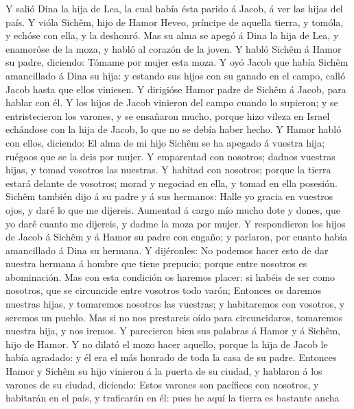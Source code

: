  Y salió Dina la hija de Lea, la cual había ésta parido á
Jacob, á ver las hijas del país.  Y vióla Sichêm, hijo de
Hamor Heveo, príncipe de aquella tierra, y tomóla, y echóse con ella, y
la deshonró.  Mas su alma se apegó á Dina la hija de Lea, y
enamoróse de la moza, y habló al corazón de la joven.  Y
habló Sichêm á Hamor su padre, diciendo: Tómame por mujer esta moza.
 Y oyó Jacob que había Sichêm amancillado á Dina su hija: y
estando sus hijos con su ganado en el campo, calló Jacob hasta que ellos
viniesen.  Y dirigióse Hamor padre de Sichêm á Jacob, para
hablar con él.  Y los hijos de Jacob vinieron del campo
cuando lo supieron; y se entristecieron los varones, y se ensañaron
mucho, porque hizo vileza en Israel echándose con la hija de Jacob, lo
que no se debía haber hecho.  Y Hamor habló con ellos,
diciendo: El alma de mi hijo Sichêm se ha apegado á vuestra hija;
ruégoos que se la deis por mujer.  Y emparentad con
nosotros; dadnos vuestras hijas, y tomad vosotros las nuestras.
 Y habitad con nosotros; porque la tierra estará delante de
vosotros; morad y negociad en ella, y tomad en ella posesión.
 Sichêm también dijo á su padre y á sus hermanos: Halle yo
gracia en vuestros ojos, y daré lo que me dijereis. 
Aumentad á cargo mío mucho dote y dones, que yo daré cuanto me dijereis,
y dadme la moza por mujer.  Y respondieron los hijos de
Jacob á Sichêm y á Hamor su padre con engaño; y parlaron, por cuanto
había amancillado á Dina su hermana.  Y dijéronles: No
podemos hacer esto de dar nuestra hermana á hombre que tiene prepucio;
porque entre nosotros es abominación.  Mas con esta
condición os haremos placer: si habéis de ser como nosotros, que se
circuncide entre vosotros todo varón;  Entonces os daremos
nuestras hijas, y tomaremos nosotros las vuestras; y habitaremos con
vosotros, y seremos un pueblo.  Mas si no nos prestareis
oído para circuncidaros, tomaremos nuestra hija, y nos iremos.
 Y parecieron bien sus palabras á Hamor y á Sichêm, hijo de
Hamor.  Y no dilató el mozo hacer aquello, porque la hija
de Jacob le había agradado: y él era el más honrado de toda la casa de
su padre.  Entonces Hamor y Sichêm su hijo vinieron á la
puerta de su ciudad, y hablaron á los varones de su ciudad, diciendo:
 Estos varones son pacíficos con nosotros, y habitarán en
el país, y traficarán en él: pues he aquí la tierra es bastante ancha
